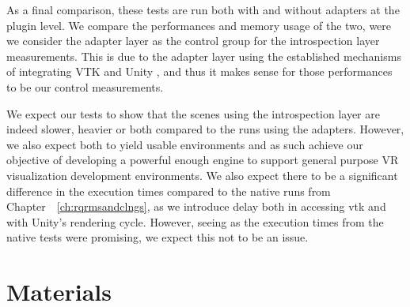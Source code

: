 \begin{table}[]
    \centering
    \caption{Execution time and number of runs for each time. These are the automatic tests only, manual tests are not included in this table.}
    \label{tab:test-specs}
\end{table}

As a final comparison, these tests are run both with and without adapters at the plugin level. We compare the performances and memory usage of the two, were we consider the adapter layer as the control group for the introspection layer measurements. This is due to the adapter layer using the established mechanisms of integrating VTK and Unity \cite{wheeler_virtual_2018,kitware_activiz}, and thus it makes sense for those performances to be our control measurements.

We expect our tests to show that the scenes using the introspection layer are indeed slower, heavier or both compared to the runs using the adapters. However, we also expect both to yield usable environments and as such achieve our objective of developing a powerful enough engine to support general purpose VR visualization development environments. We also expect there to be a significant difference in the execution times compared to the native runs from Chapter~~\ref{ch:rqrmsandclngs}, as we introduce delay both in accessing \acrshort{vtk} and with Unity's rendering cycle. However, seeing as the execution times from the native tests were promising, we expect this not to be an issue.

\section{Materials}
\label{sec:materials}


